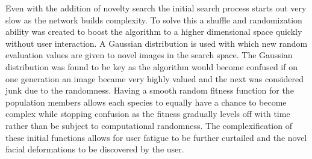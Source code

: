 Even with the addition of novelty search the initial search process starts out very slow as the network builds complexity. To solve this 
a shuffle and randomization ability was created to boost the algorithm to a higher dimensional space quickly without user interaction.
A Gaussian distribution is used with which new random evaluation values are given to novel images in the search space. The Gaussian
distribution was found to be key as the algorithm would become confused if on one generation an image became very highly valued and the next
was considered junk due to the randomness. Having a smooth random fitness function for the population members allows each species to equally
have a chance to become complex while stopping confusion as the fitness gradually levels off with time rather than be subject to computational
randomness. The complexification of these initial functions allows for user fatigue to be further curtailed and the novel facial 
deformations to be discovered by the user.
